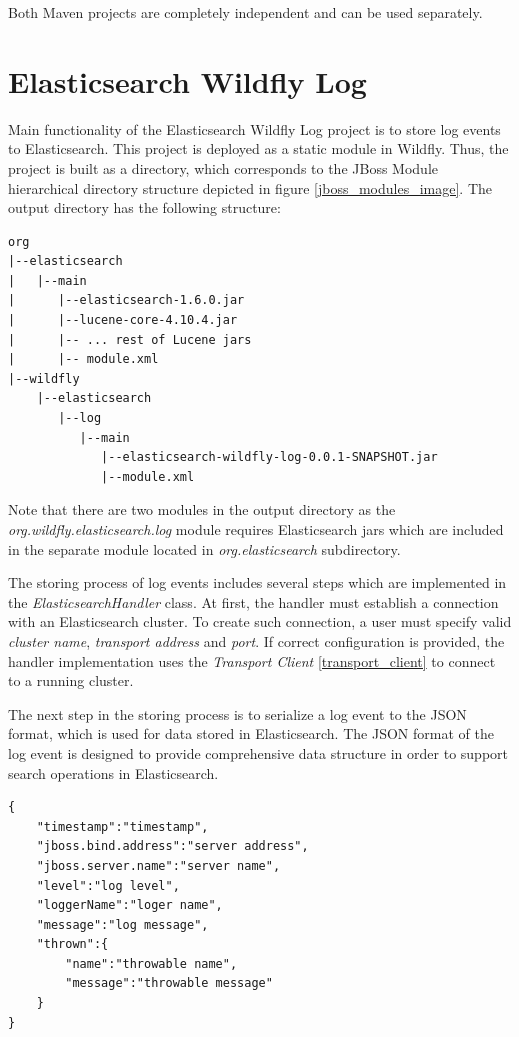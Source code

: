 \documentclass[12pt,oneside]{fithesis2}
\begin{document}
Both Maven projects are completely independent and can be used separately.

\section{Elasticsearch Wildfly Log}
Main functionality of the Elasticsearch Wildfly Log project is to store log events to Elasticsearch. This project is deployed as a static module in Wildfly. Thus, the project is built as a directory, which corresponds to the JBoss Module hierarchical directory structure depicted in figure \ref{jboss_modules_image}. The output directory has the following structure:

\begin{lstlisting}[caption = Elasticsearch Wildfly Log module directory structure, label = elasticsearch_module_structure]
org
|--elasticsearch
|   |--main
|      |--elasticsearch-1.6.0.jar
|      |--lucene-core-4.10.4.jar
|      |-- ... rest of Lucene jars
|      |-- module.xml
|--wildfly
    |--elasticsearch
       |--log
          |--main
             |--elasticsearch-wildfly-log-0.0.1-SNAPSHOT.jar
             |--module.xml
\end{lstlisting}

\noindent
Note that there are two modules in the output directory as the \textit{org.wildfly.elasticsearch.log} module requires Elasticsearch jars which are included in the separate module located in \textit{org.elasticsearch} subdirectory.

The storing process of log events includes several steps which are implemented in the \textit{ElasticsearchHandler} class. At first, the handler must establish a connection with an Elasticsearch cluster. To create such connection, a user must specify valid \textit{cluster name}, \textit{transport address} and \textit{port}.
If correct configuration is provided, the handler implementation uses the \textit{Transport Client} \ref{transport_client} to connect to a running cluster.

The next step in the storing process is to serialize a log event to the JSON format, which is used for data stored in Elasticsearch. The JSON format of the log event is designed to provide comprehensive data structure in order to support search operations in Elasticsearch.



\begin{verbatim}
{
	"timestamp":"timestamp",
	"jboss.bind.address":"server address",
	"jboss.server.name":"server name",
	"level":"log level",
	"loggerName":"loger name",
	"message":"log message",
	"thrown":{
		"name":"throwable name",
		"message":"throwable message"
	}
}	
\end{verbatim}
\begin{lstlisting}[aboveskip = 0em, frame = none, caption = JSON format of a log event]
\end{lstlisting}
\end{document}
